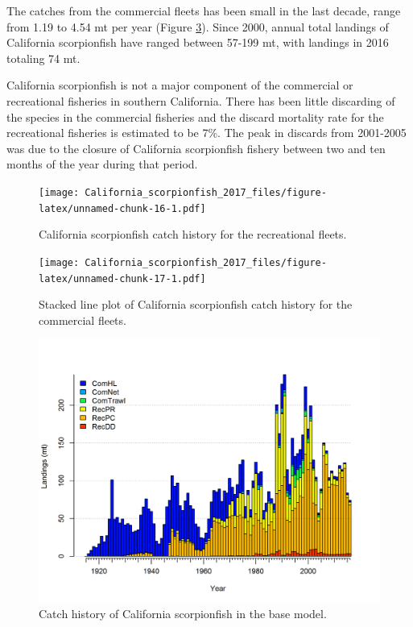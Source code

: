 \documentclass[12pt,]{article}
\begin{document}
The catches from the commercial fleets has been small in the last
decade, range from 1.19 to 4.54 mt per year (Figure
\ref{fig:r4ss_catches}). Since 2000, annual total landings of California
scorpionfish have ranged between 57-199 mt, with landings in 2016
totaling 74 mt.

California scorpionfish is not a major component of the commercial or
recreational fisheries in southern California. There has been little
discarding of the species in the commercial fisheries and the discard
mortality rate for the recreational fisheries is estimated to be 7\%.
The peak in discards from 2001-2005 was due to the closure of California
scorpionfish fishery between two and ten months of the year during that
period.

\FloatBarrier

\begin{figure}[htbp]
\centering
\texttt{[image: California\_scorpionfish\_2017\_files/figure-latex/unnamed-chunk-16-1.pdf]}
\caption{California scorpionfish catch history for the recreational
fleets. \label{fig:Exec_catch1}}
\end{figure}

\begin{figure}[htbp]
\centering
\texttt{[image: California\_scorpionfish\_2017\_files/figure-latex/unnamed-chunk-17-1.pdf]}
\caption{Stacked line plot of California scorpionfish catch history for
the commercial fleets. \label{fig:Exec_catch2}}
\end{figure}

\FloatBarrier

\begin{figure}[htbp]
\centering
\includegraphics{r4ss/plots_mod1/catch2 landings stacked.png}
\caption{Catch history of California scorpionfish in the base model.
\label{fig:r4ss_catches}}
\end{figure}
\end{document}
